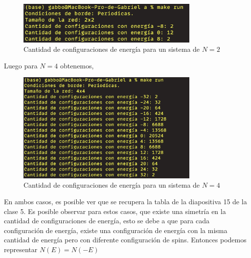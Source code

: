 \documentclass[11pt,a4paper]{article}
\begin{document}
\begin{figure}[H]
    \centering
    \includegraphics[width=0.8\textwidth]{p2/a/p2_1.png}
    \caption{Cantidad de configuraciones de energía para un sistema de $N=2$}
    \label{fig:p2_1}
\end{figure}
Luego para $N = 4$ obtenemos,
\begin{figure}[H]
    \centering
    \includegraphics[width=0.8\textwidth]{p2/a/p2_2.png}
    \caption{Cantidad de configuraciones de energía para un sistema de $N=4$}
    \label{fig:p2_2}
\end{figure}
En ambos casos, es posible ver que se recupera la tabla de la diapositiva 15 de la clase 5. Es posible observar para estos casos, que existe una simetría en la cantidad de configuraciones de energía, esto se debe a que
para cada configuración de energía, existe una configuración de energía con la misma cantidad de energía pero con diferente configuración de spins. Entonces podemos representar $N(E) = N(-E)$
\end{document}
